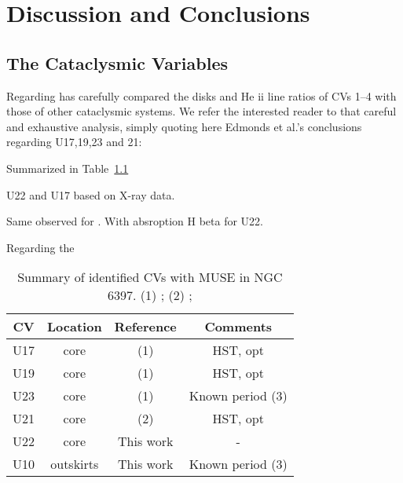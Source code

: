 \chapter{Discussion and Conclusions}\label{chap:conclu}
\thispagestyle{fancy}

\section{The Cataclysmic Variables}


Regarding \cite{edmonds_cataclysmic_1999} has carefully compared the disks and He ii line ratios of CVs 1–4 with those of other cataclysmic systems. We refer the interested reader to that careful and exhaustive analysis, simply quoting here Edmonds et al.’s conclusions regarding U17,19,23 and 21:

Summarized in Table~\ref{tab:sum}

U22 and U17 based on X-ray data. 

Same observed for . With absroption H beta for U22. 

Regarding the 

\begin{comment}
U17 CV3 -- Dwarf Nova
U19 CV2 -- Dwarf Nova
U23 CV1
U21 CV4
U10 CV6
U22 CV5
observed to undergo dwarf nova (DN ) eruptions with amplitudes
of at least 1.8 and 2.7 mag.
\end{comment}

\begin{table}[]
        \centering
\begin{tabular}{|c|c|c|c|}
\hline
\textbf{CV} & \textbf{Location} &  \textbf{Reference} & \textbf{Comments}\\ \hline
U17 & core  &  (1) & HST, opt           \\ \hline
U19 & core  &  (1) & HST, opt           \\ \hline
U23         & core   & (1)                       &  Known period (3)             \\ \hline

U21         & core  & (2)   & HST, opt                            \\ \hline
U22         & core                       & This work                         &   -                         \\ \hline
U10         & outskirts                        & This work                      &  Known period (3)              \\ \hline
\end{tabular}
\caption[Summary of identified CVs with MUSE in NGC 6397]{Summary of identified CVs with MUSE in NGC 6397. (1) \citealt{grindlay_spectroscopic_1995}; (2) \citealt{edmonds_cataclysmic_1999}; \citealt{kaluzny_time_2003} }
\label{tab:sum}
\end{table}


